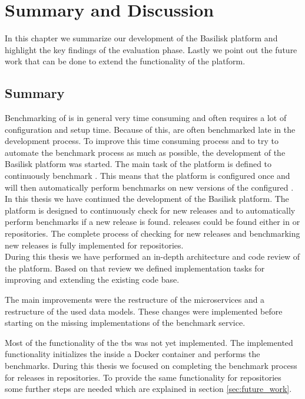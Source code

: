 \chapter{Summary and Discussion}
\label{ch:summary}

In this chapter we summarize our development of the Basilisk platform and highlight the key findings of the evaluation phase.
Lastly we point out the future work that can be done to extend the functionality of the platform.

\section{Summary}
Benchmarking of \tsp{} is in general very time consuming and often requires a lot of configuration and setup time.
Because of this, \tsp{} are often benchmarked late in the development process.
To improve this time consuming process and to try to automate the benchmark process as much as possible, the development of the Basilisk platform was started.
The main task of the platform is defined to continuously benchmark \tsp{}.
This means that the platform is configured once and will then automatically perform benchmarks on new versions of the configured \tsp{}.
\\

In this thesis we have continued the development of the Basilisk platform.
The platform is designed to continuously check for new \ts{} releases and to automatically perform benchmarks if a new release is found.
\ts{} releases could be found either in \dockh{} or \gh{} repositories.
The complete process of checking for new releases and benchmarking new releases is fully implemented for \dockh{} repositories.
\\

During this thesis we have performed an in-depth architecture and code review of the platform.
Based on that review we defined implementation tasks for improving and extending the existing code base.

The main improvements were the restructure of the microservices and a restructure of the used data models.
These changes were implemented before starting on the missing implementations of the benchmark service.

Most of the functionality of the \acl{tbs} was not yet implemented.
The implemented functionality initializes the \ts{} inside a Docker container and performs the benchmarks.
During this thesis we focused on completing the benchmark process for \ts{} releases in \dockh{} repositories.
To provide the same functionality for \gh{} repositories some further steps are needed which are explained in section \ref{sec:future_work}.

